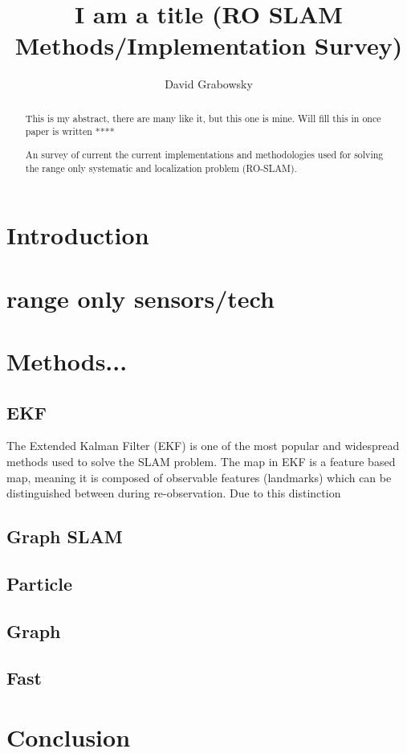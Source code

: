 \documentclass[conference]{IEEEtran}
\begin{document}
	\title{I am a title (RO SLAM Methods/Implementation Survey) }

	\author{David Grabowsky}
	
	
	
	
	\maketitle
	
	
\begin{abstract}

	
	This is my abstract, there are many like it, but this one is mine. Will fill this in once paper is written ****
	
	An survey of current the current implementations and methodologies used for solving the range only systematic and localization problem (RO-SLAM). 

\end{abstract}
	
	
	
\section{Introduction} 

\section{range only sensors/tech}
\section{Methods...}
\subsection{EKF}
The Extended Kalman Filter (EKF) is one of the most popular and widespread methods used to solve the SLAM problem. The map in EKF is a feature based map, meaning it is composed of observable features (landmarks) which can be distinguished between during re-observation.  
Due to this distinction  	
	
\subsection{Graph SLAM}
\subsection{Particle}
\subsection{Graph}
\subsection{Fast}

\section{Conclusion}

	
	
	
	
\end{document}
